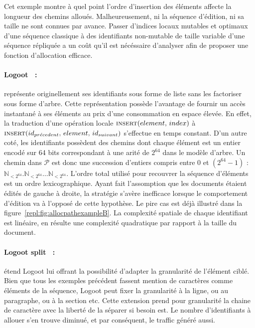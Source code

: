 Cet exemple montre à quel point l'ordre d'insertion des éléments affecte la
longueur des chemins alloués. Malheureusement, ni la séquence d'édition, ni sa
taille ne sont connues par avance.  Passer d'indices locaux mutables et optimaux
d'une séquence classique à des identifiants non-mutable de taille variable d'une
séquence répliquée a un coût qu'il est nécéssaire d'analyser afin de proposer
une fonction d'allocation efficace.


\paragraph{Logoot~\cite{weiss2010collaborative, weiss2009logoot,
    weiss2010logootundo} :} représente originellement ses identifiants sous
forme de liste sans les factoriser sous forme d'arbre. Cette représentation
possède l'avantage de fournir un accès instantané à ses éléments au prix d'une
consommation en espace élevée. En effet, la traduction d'une opération locale
$\textsc{insert}(element,\, index)$ à
$\textsc{insert}(id_{pr\acute{e}cedent},\, element,\, id_{suivant})$ s'effectue
en temps constant. D'un autre coté, les identifiants possèdent des chemins dont
chaque élément est un entier encodé sur 64 bits correspondant à une arité de
$2^{64}$ dans le modèle d'arbre. Un chemin dans $\mathcal{P}$ est donc une
succession d'entiers compris entre 0 et $(2^{64}-1)$ :
$\mathbb{N}_{<2^{64}}.\mathbb{N}_{<2^{64}}\ldots\mathbb{N}_{<2^{64}}$.  L'ordre
total utilisé pour recouvrer la séquence d'éléments est un ordre
lexicographique. Ayant fait l'assomption que les documents étaient édités de
gauche à droite, la stratégie s'avère inefficace lorsque le comportement
d'édition va à l'opposé de cette hypothèse. Le pire cas est déjà illustré dans
la figure~\ref{repl:fig:allocpathexampleB}. La complexité spatiale de chaque
identifiant est linéaire, en résulte une complexité quadratique par rapport à la
taille du document.

\paragraph{Logoot split~\cite{mehdi2014merging} :} étend Logoot lui offrant la
possibilité d'adapter la granularité de l'élément ciblé. Bien que tous les
exemples précédent fassent mention de caractères comme éléments de la séquence,
Logoot peut fixer la granularité à la ligne, ou au paragraphe, ou à la section
etc. Cette extension prend pour granularité la chaine de caractère avec la
liberté de la séparer si besoin est. Le nombre d'identifiants à allouer s'en
trouve diminué, et par conséquent, le traffic généré aussi.
